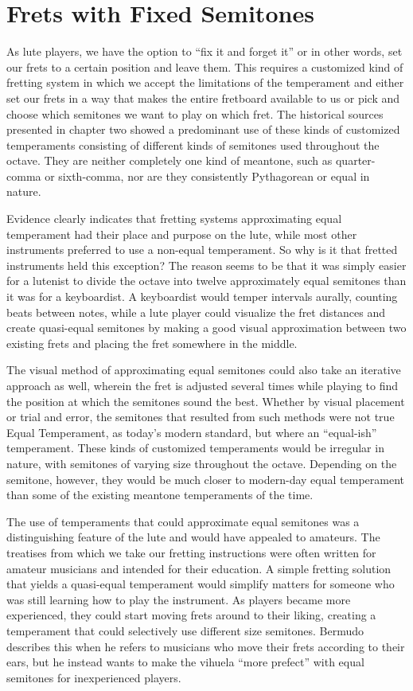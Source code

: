 \section{Frets with Fixed Semitones}

As lute players, we have the option to ``fix it and forget it'' or in other words, set
our frets to a certain position and leave them. This requires a customized kind of
fretting system in which we accept the limitations of the temperament and either set
our frets in a way that makes the entire fretboard available to us or pick and choose
which semitones we want to play on which fret. The historical sources presented in
chapter two showed a predominant use of these kinds of customized temperaments
consisting of different kinds of semitones used throughout the octave. They are neither
completely one kind of meantone, such as quarter-comma or sixth-comma, nor are they
consistently Pythagorean or equal in nature.

Evidence clearly indicates that fretting systems approximating equal temperament had
their place and purpose on the lute, while most other instruments preferred to use a
non-equal temperament.  So why is it that fretted instruments held this exception? The
reason seems to be that it was simply easier for a lutenist to divide the octave into
twelve approximately equal semitones than it was for a keyboardist. A keyboardist would
temper intervals aurally, counting beats between notes, while a lute player could
visualize the fret distances and create quasi-equal semitones by making a good
visual approximation between two existing frets and placing the fret somewhere in the
middle.

The visual method of approximating equal semitones could also take an iterative approach as well,
wherein the fret is adjusted several times while playing to find the position at which the semitones
sound the best. Whether by visual placement or trial and error, the semitones that resulted from
such methods were not true Equal Temperament, as today's modern standard, but where an ``equal-ish''
temperament. These kinds of customized temperaments would be irregular in nature, with semitones of
varying size throughout the octave.  Depending on the semitone, however, they would be much closer
to modern-day equal temperament than some of the existing meantone temperaments of the time.

The use of temperaments that could approximate equal semitones was a distinguishing
feature of the lute and would have appealed to amateurs. The treatises from which we
take our fretting instructions were often written for amateur musicians and intended
for their education. A simple fretting solution that yields a quasi-equal temperament
would simplify matters for someone who was still learning how to play the instrument.
As players became more experienced, they could start moving frets around to their
liking, creating a temperament that could selectively use different size
semitones. Bermudo describes this when he refers to musicians who move their
frets according to their ears, but he instead wants to make the vihuela ``more
prefect'' with equal semitones for inexperienced players.\autocite[78]{DE:1}

